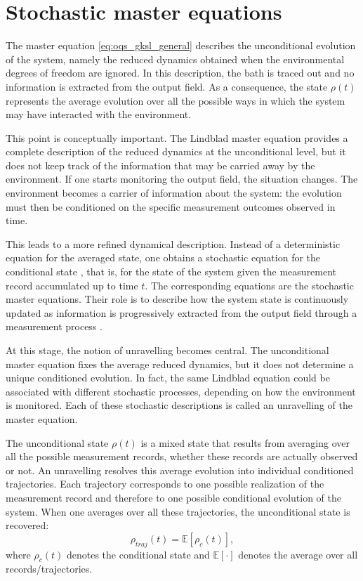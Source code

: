 \section{Stochastic master equations}
\label{sec:derivation_stochastic_master_equations}

The master equation \eqref{eq:oqs_gksl_general} describes the unconditional evolution of the system, namely the reduced dynamics obtained when the environmental degrees of freedom are ignored. In this description, the bath is traced out and no information is extracted from the output field. As a consequence, the state \(\rho(t)\) represents the average evolution over all the possible ways in which the system may have interacted with the environment.

This point is conceptually important. The Lindblad master equation provides a complete description of the reduced dynamics at the unconditional level, but it does not keep track of the information that may be carried away by the environment. If one starts monitoring the output field, the situation changes. The environment becomes a carrier of information about the system: the evolution must then be conditioned on the specific measurement outcomes observed in time.

This leads to a more refined dynamical description. Instead of a deterministic equation for the averaged state, one obtains a stochastic equation for the conditional state \cite{Jac06}, that is, for the state of the system given the measurement record accumulated up to time \(t\). The corresponding equations are the stochastic master equations. Their role is to describe how the system state is continuously updated as information is progressively extracted from the output field through a measurement process \cite{Vac24,GenAlb01}.

At this stage, the notion of unravelling becomes central. The unconditional master equation fixes the average reduced dynamics, but it does not determine a unique conditioned evolution. In fact, the same Lindblad equation could be associated with different stochastic processes, depending on how the environment is monitored. Each of these stochastic descriptions is called an unravelling of the master equation.

The unconditional state \(\rho(t)\) is a mixed state that results from averaging over all the possible measurement records, whether these records are actually observed or not. An unravelling resolves this average evolution into individual conditioned trajectories. Each trajectory corresponds to one possible realization of the measurement record and therefore to one possible conditional evolution of the system. When one averages over all these trajectories, the unconditional state is recovered:
\begin{equation}
	\rho_{traj}(t)=\mathbb{E}\!\left[\rho_c(t)\right],
	\label{eq:sme_unconditional_as_average_of_conditional}
\end{equation}
where \(\rho_c(t)\) denotes the conditional state and \(\mathbb{E}[\cdot]\) denotes the average over all records/trajectories.

